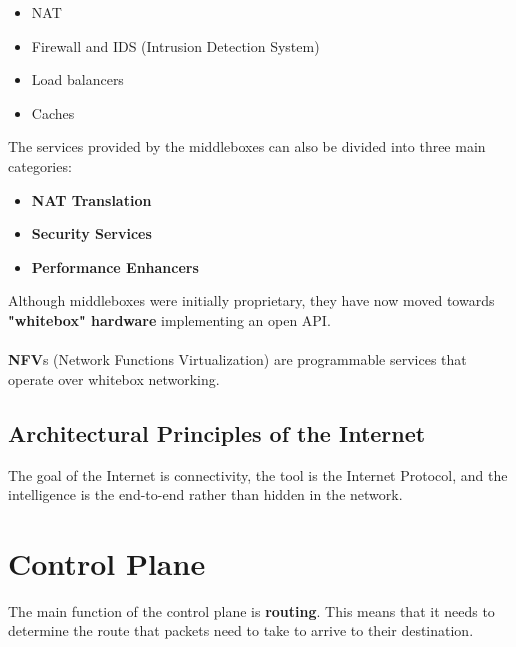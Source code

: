 \documentclass{article}
\begin{document}
\begin{itemize}
	\item NAT
	\item Firewall and IDS (Intrusion Detection System)
	\item Load balancers
	\item Caches
\end{itemize}
The services provided by the middleboxes can also be divided into three main categories:

\begin{itemize}
	\item \textbf{NAT Translation}
	\item \textbf{Security Services}
	\item \textbf{Performance Enhancers}
\end{itemize}
Although middleboxes were initially proprietary, they have now moved towards \textbf{"whitebox" hardware} implementing an open API. \\ \\
\textbf{NFV}s (Network Functions Virtualization) are programmable services that operate over whitebox networking.

\subsection{Architectural Principles of the Internet}
The goal of the Internet is connectivity, the tool is the Internet Protocol, and the intelligence is the end-to-end rather than hidden in the network.

\section{Control Plane}
The main function of the control plane is \textbf{routing}. This means that it needs to determine the route that packets need to take to arrive to their destination.
\end{document}
